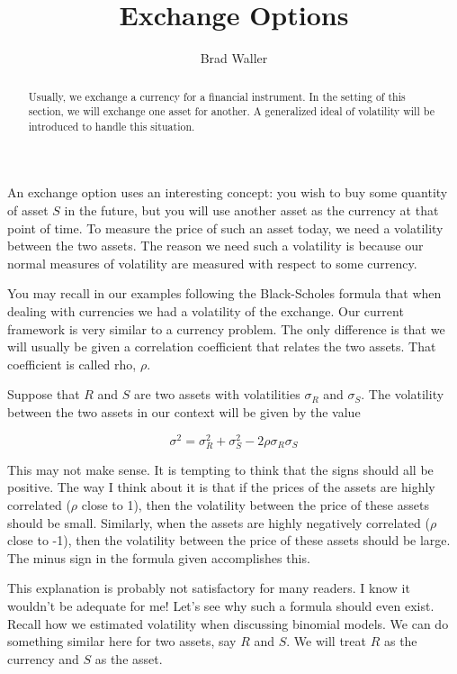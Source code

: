 \documentclass{ximera}
\author{Brad Waller}
\title{Exchange Options}
\begin{document}
\begin{abstract}
Usually, we exchange a currency for a financial instrument. In the setting of this section, we will exchange one asset for another. A generalized ideal of volatility will be introduced to handle this situation.
\end{abstract}

\maketitle

An exchange option uses an interesting concept: you wish to buy some quantity of asset $S$ in the future, but you will use another asset as the currency at that point of time. To measure the price of such an asset today, we need a volatility between the two assets. The reason we need such a volatility is because our normal measures of volatility are measured with respect to some currency. 

You may recall in our examples following the Black-Scholes formula that when dealing with currencies we had a volatility of the exchange. Our current framework is very similar to a currency problem. The only difference is that we will usually be given a correlation coefficient that relates the two assets. That coefficient is called rho, $\rho$. 

Suppose that $R$ and $S$ are two assets with volatilities $\sigma_R$ and $\sigma_S$. The volatility between the two assets in our context will be given by the value

\begin{equation*}
\sigma^2=\sigma_R^2+\sigma_S^2-2\rho\sigma_R\sigma_S
\end{equation*}

This may not make sense. It is tempting to think that the signs should all be positive. The way I think about it is that if the prices of the assets are highly correlated ($\rho$ close to 1), then the volatility between the price of these assets should be small. Similarly, when the assets are highly negatively correlated ($\rho$ close to -1), then the volatility between the price of these assets should be large. The minus sign in the formula given accomplishes this. 

This explanation is probably not satisfactory for many readers. I know it wouldn't be adequate for me! Let's see why such a formula should even exist. Recall how we estimated volatility when discussing binomial models. We can do something similar here for two assets, say $R$ and $S$. We will treat $R$ as the currency and $S$ as the asset. 
\end{document}
